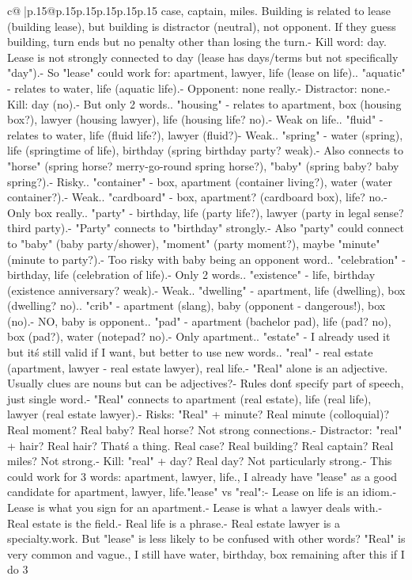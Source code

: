 \documentclass{article}
\begin{document}
{\begin{supertabular}{c@{$\;$}|p{.15\linewidth}@{}p{.15\linewidth}p{.15\linewidth}p{.15\linewidth}p{.15\linewidth}p{.15\linewidth}}
{{{case, captain, miles. Building is related to lease (building lease), but building is distractor (neutral), not opponent. If they guess building, turn ends but no penalty other than losing the turn.\n    - Kill word: day. Lease is not strongly connected to day (lease has days/terms but not specifically "day").\n    - So "lease" could work for: apartment, lawyer, life (lease on life).. "aquatic" - relates to water, life (aquatic life).\n    - Opponent: none really.\n    - Distractor: none.\n    - Kill: day (no).\n    - But only 2 words.. "housing" - relates to apartment, box (housing box?), lawyer (housing lawyer), life (housing life? no).\n    - Weak on life.. "fluid" - relates to water, life (fluid life?), lawyer (fluid?)\n    - Weak.. "spring" - water (spring), life (springtime of life), birthday (spring birthday party? weak).\n    - Also connects to "horse" (spring horse? merry-go-round spring horse?), "baby" (spring baby? baby spring?).\n    - Risky.. "container" - box, apartment (container living?), water (water container?).\n    - Weak.. "cardboard" - box, apartment? (cardboard box), life? no.\n    - Only box really.. "party" - birthday, life (party life?), lawyer (party in legal sense? third party).\n    - "Party" connects to "birthday" strongly.\n    - Also "party" could connect to "baby" (baby party/shower), "moment" (party moment?), maybe "minute" (minute to party?).\n    - Too risky with baby being an opponent word.. "celebration" - birthday, life (celebration of life).\n    - Only 2 words.. "existence" - life, birthday (existence anniversary? weak).\n    - Weak.. "dwelling" - apartment, life (dwelling), box (dwelling? no).. "crib" - apartment (slang), baby (opponent - dangerous!), box (no).\n    - NO, baby is opponent.. "pad" - apartment (bachelor pad), life (pad? no), box (pad?), water (notepad? no).\n    - Only apartment.. "estate" - I already used it but it\'s still valid if I want, but better to use new words.. "real" - real estate (apartment, lawyer - real estate lawyer), real life.\n    - "Real" alone is an adjective. Usually clues are nouns but can be adjectives?\n    - Rules don\'t specify part of speech, just single word.\n    - "Real" connects to apartment (real estate), life (real life), lawyer (real estate lawyer).\n    - Risks: "Real" + minute? Real minute (colloquial)? Real moment? Real baby? Real horse? Not strong connections.\n    - Distractor: "real" + hair? Real hair? That\'s a thing. Real case? Real building? Real captain? Real miles? Not strong.\n    - Kill: "real" + day? Real day? Not particularly strong.\n    - This could work for 3 words: apartment, lawyer, life.\n\nWait, I already have "lease" as a good candidate for apartment, lawyer, life.\n\nComparing "lease" vs "real":\n- Lease on life is an idiom.\n- Lease is what you sign for an apartment.\n- Lease is what a lawyer deals with.\n- Real estate is the field.\n- Real life is a phrase.\n- Real estate lawyer is a specialty.\n\nBoth work. But "lease" is less likely to be confused with other words? "Real" is very common and vague.\n\nAlso, I still have water, birthday, box remaining after this if I do 3 }}}
\end{supertabular}}
\end{document}
